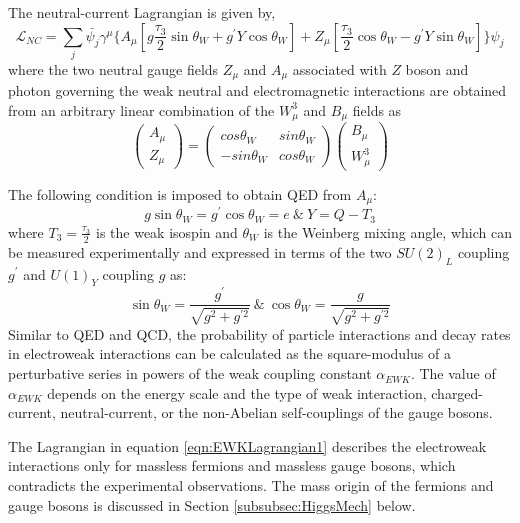The neutral-current Lagrangian is given by, 
\begin{equation}
\mathcal{L}_{NC} = \sum_{j}{ \bar{\psi_{j}} \gamma^{\mu} \{ A_{\mu} [ g \frac{\tau_{3}}{2} \sin\theta_{W} + g^{'} Y \cos\theta_{W} ] + Z_{\mu} [ \frac{\tau_{3}}{2} \cos\theta_{W} - g^{'} Y \sin\theta_{W}] \} \psi_{j} }
\label{eqn:SU2NCLag}
\end{equation}
where the two neutral gauge fields $Z_{\mu}$ and $A_{\mu}$ associated with $Z$ boson and photon governing the weak neutral and electromagnetic interactions are obtained from an arbitrary linear combination of the $W^{3}_{\mu}$ and $B_{\mu}$ fields as 
\begin{equation}
\begin{pmatrix} A_{\mu} \\ Z_{\mu} \end{pmatrix} =  \begin{pmatrix} cos{\theta_{W}} & sin{\theta_{W}} \\ -sin{\theta_{W}} & cos{\theta_{W}} \end{pmatrix} \begin{pmatrix} B_{\mu} \\ W^{3}_{\mu} \end{pmatrix}
\label{eqn:NeutralGaugeBosons}
\end{equation}

The following condition is imposed to obtain QED from $A_{\mu}$:
\begin{equation}
g \sin\theta_{W} = g^{'} \cos\theta_{W} = e ~\& ~  Y= Q - T_{3}
\label{eqn:QEDFromEWk}
\end{equation}
where $T_{3}=\frac{\tau_{3}}{2}$ is the weak isospin and $\theta_{W}$ is the Weinberg mixing angle, which can be measured experimentally and expressed in terms of the two $SU(2)_{L}$ coupling $g^{'}$ and $U(1)_{Y}$ coupling $g$ as:
\begin{equation}
\sin\theta_{W} = \frac{g^{'}}{\sqrt{g^{2} +  g^{'2} }} ~\&~ \cos\theta_{W} = \frac{g}{\sqrt{g^{2} +  g^{'2} }}
\label{eqn:WeinbergAngle}
\end{equation}
Similar to QED and QCD, the probability of particle interactions and decay rates in electroweak interactions can be calculated as the square-modulus of a perturbative series in powers of the weak coupling constant $\alpha _{EWK}$. The value of $\alpha _{EWK}$ depends on the energy scale and the type of weak interaction, charged-current, neutral-current, or the non-Abelian self-couplings of the gauge bosons. 

The Lagrangian in equation \ref{eqn:EWKLagrangian1} describes the electroweak interactions only for massless fermions and massless gauge bosons, which contradicts the experimental observations. The mass origin of the fermions and gauge bosons is discussed in Section \ref{subsubsec:HiggsMech} below. 

